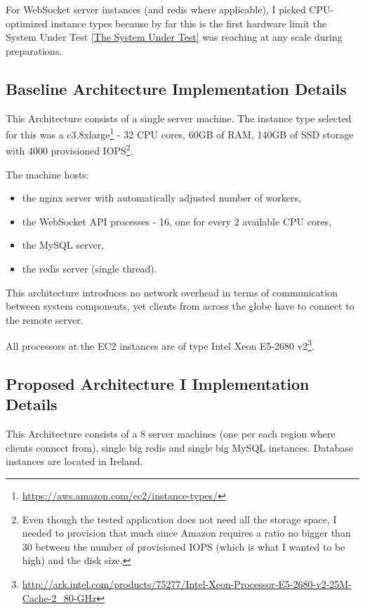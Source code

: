 \documentclass{uvamscse}
\begin{document}
For WebSocket server instances (and redis where applicable), I picked CPU-optimized instance types because by far this is the first hardware limit the System Under Test \ref{The System Under Test} was reaching at any scale during preparations.

\subsection{Baseline Architecture Implementation Details}\label{Baseline Architecture Implementation Details}

This Architecture consists of a single server machine. The instance type selected for this was a c3.8xlarge\footnote{\url{https://aws.amazon.com/ec2/instance-types/}} - 32 CPU cores, 60GB of RAM, 140GB of SSD storage with 4000 provisioned IOPS\footnote{Even though the tested application does not need all the storage space, I needed to provision that much since Amazon requires a ratio no bigger than 30 between the number of provisioned IOPS (which is what I wanted to be high) and the disk size.}.

The machine hosts:
\begin{itemize}
  \item the nginx server with automatically adjusted number of workers,
  \item the WebSocket API processes - 16, one for every 2 available CPU cores,
  \item the MySQL server,
  \item the redis server (single thread).
\end{itemize}

This architecture introduces no network overhead in terms of communication between system components, yet clients from across the globe have to connect to the remote server.

All processors at the EC2 instances are of type Intel Xeon E5-2680 v2\footnote{\url{http://ark.intel.com/products/75277/Intel-Xeon-Processor-E5-2680-v2-25M-Cache-2_80-GHz}}.

\subsection{Proposed Architecture I Implementation Details}\label{Proposed Architecture I Implementation Details}

This Architecture consists of a 8 server machines (one per each region where clients connect from), single big redis and single big MySQL instances. Database instances are located in Ireland.
\end{document}
